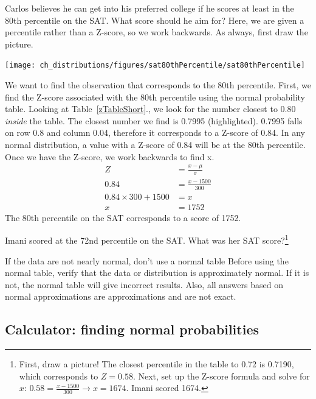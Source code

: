\begin{example}{Carlos believes he can get into his preferred college if he scores at least in the 80th percentile on the SAT. What score should he aim for?}
Here, we are given a percentile rather than a Z-score, so we work backwards. As always, first draw the picture.
\begin{center}
\texttt{[image: ch\_distributions/figures/sat80thPercentile/sat80thPercentile]}
\end{center}
We want to find the observation that corresponds to the 80th percentile. First, we find the Z-score associated with the 80th percentile using the normal probability table. Looking at Table~\ref{zTableShort}., we look for the number closest to 0.80 \emph{inside} the table. The closest number we find is 0.7995 (highlighted). 0.7995 falls on row 0.8 and column 0.04, therefore it corresponds to a Z-score of 0.84. In any normal distribution, a value with a Z-score of 0.84 will be at the 80th percentile. Once we have the Z-score, we work backwards to find x.
\begin{align*}
Z &= \frac{x-\mu}{\sigma} \\
0.84 &= \frac{x-1500}{300} \\
0.84 \times 300+1500 &= x \\
x& = 1752
\end{align*}
The 80th percentile on the SAT corresponds to a score of 1752.
\end{example}

\begin{exercise}Imani scored at the 72nd percentile on the SAT. What was her SAT score?\footnote{First, draw a picture! The closest percentile in the table to 0.72 is 0.7190, which corresponds to $Z = 0.58$. Next, set up the Z-score formula and solve for $x$: $0.58 = \frac{x-1500}{300} \rightarrow x = 1674$. Imani scored 1674.}
\end{exercise}

\begin{caution}{If the data are not nearly normal, don't use a normal table}
{Before using the normal table, verify that the data or distribution is approximately normal. If it is not, the normal table will give incorrect results. Also, all answers based on normal approximations are approximations and are not exact.}
\end{caution}



\subsection{Calculator: finding normal probabilities}
\label{TInormal}

